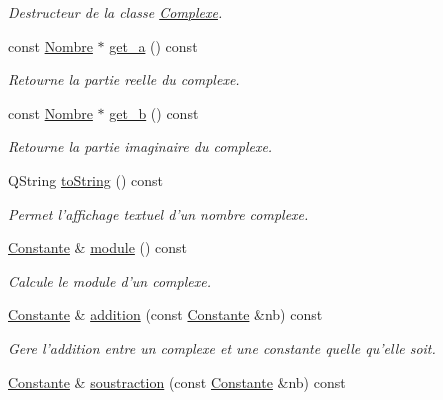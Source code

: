 \begin{DoxyCompactItemize}
\begin{DoxyCompactList}\small\item\em \-Destructeur de la classe \hyperlink{class_l_o21_1_1_complexe}{\-Complexe}. \end{DoxyCompactList}\item 
const \hyperlink{class_l_o21_1_1_nombre}{\-Nombre} $\ast$ \hyperlink{class_l_o21_1_1_complexe_a97339c7e868c0b487f69b8b001efed67}{get\-\_\-a} () const 
\begin{DoxyCompactList}\small\item\em \-Retourne la partie reelle du complexe. \end{DoxyCompactList}\item 
const \hyperlink{class_l_o21_1_1_nombre}{\-Nombre} $\ast$ \hyperlink{class_l_o21_1_1_complexe_af2221f90de1c2558ed18020b0f5b10cd}{get\-\_\-b} () const 
\begin{DoxyCompactList}\small\item\em \-Retourne la partie imaginaire du complexe. \end{DoxyCompactList}\item 
\-Q\-String \hyperlink{class_l_o21_1_1_complexe_a327fd83ec9743fb43c5d47831d8ed45c}{to\-String} () const 
\begin{DoxyCompactList}\small\item\em \-Permet l'affichage textuel d'un nombre complexe. \end{DoxyCompactList}\item 
\hyperlink{class_l_o21_1_1_constante}{\-Constante} \& \hyperlink{class_l_o21_1_1_complexe_a6b6c993906543f2fe78d8cb1be6244b3}{module} () const 
\begin{DoxyCompactList}\small\item\em \-Calcule le module d'un complexe. \end{DoxyCompactList}\item 
\hyperlink{class_l_o21_1_1_constante}{\-Constante} \& \hyperlink{class_l_o21_1_1_complexe_ad5808de0a73b0116d8df9ab7d1be599b}{addition} (const \hyperlink{class_l_o21_1_1_constante}{\-Constante} \&nb) const 
\begin{DoxyCompactList}\small\item\em \-Gere l'addition entre un complexe et une constante quelle qu'elle soit. \end{DoxyCompactList}\item 
\hyperlink{class_l_o21_1_1_constante}{\-Constante} \& \hyperlink{class_l_o21_1_1_complexe_a4b699507ed3f22fde85fb4a569fe0f14}{soustraction} (const \hyperlink{class_l_o21_1_1_constante}{\-Constante} \&nb) const 

\end{DoxyCompactItemize}
